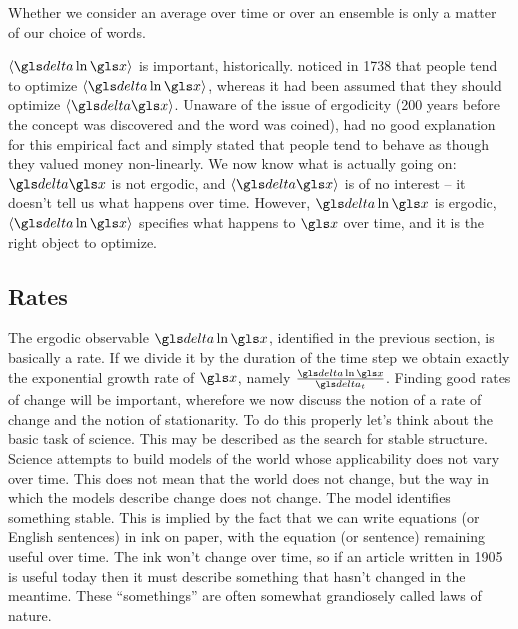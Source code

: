 Whether we consider  an average over 
time or over an ensemble is only a matter of our choice of words. 

$\ave{\d \ln \x}$ is important, historically.  noticed in 
1738 \cite{Bernoulli1738} that people tend to
optimize $\ave{\d \ln \x}$, whereas it had been assumed that they should optimize $\ave{\d \x}$. 
Unaware of the issue of ergodicity (200 years before the concept was discovered 
and the word was coined),  had no good explanation for this 
empirical fact and simply stated that people tend to behave as though they valued
money non-linearly. We now know what is actually going on: $\d \x$ is not ergodic, 
and $\ave{\d \x}$ is of no interest -- it doesn't tell us what happens over time. However,
$\d \ln \x$ is ergodic, $\ave{\d \ln \x}$ specifies what happens to $\x$ over time, and it
is the right object to optimize.


\subsection{Rates}
The ergodic observable $\d \ln \x$, identified in the previous section, is basically a rate.
If we divide it by the duration of the time step we obtain exactly the exponential 
growth rate of $\x$, namely $\frac{\d \ln \x}{\dt}$. Finding good rates of change 
will be important, wherefore we now discuss the notion of a rate of change and 
the notion of stationarity. 
To do this properly let's think about the basic task of science. This may be described as the 
search for stable structure. Science attempts to build models of the world 
whose applicability does not vary over time. This does not mean that the world does not change, 
but the way in which the models describe change does not change. The model identifies
something stable. This is implied by the fact that we can write 
equations (or English sentences) in ink on paper, with the equation (or sentence) remaining 
useful over time. The ink won't change over time, so
if an article written in 1905 is useful today then it must describe something that hasn't 
changed in the meantime. These ``somethings'' are often somewhat 
grandiosely called laws of nature.

